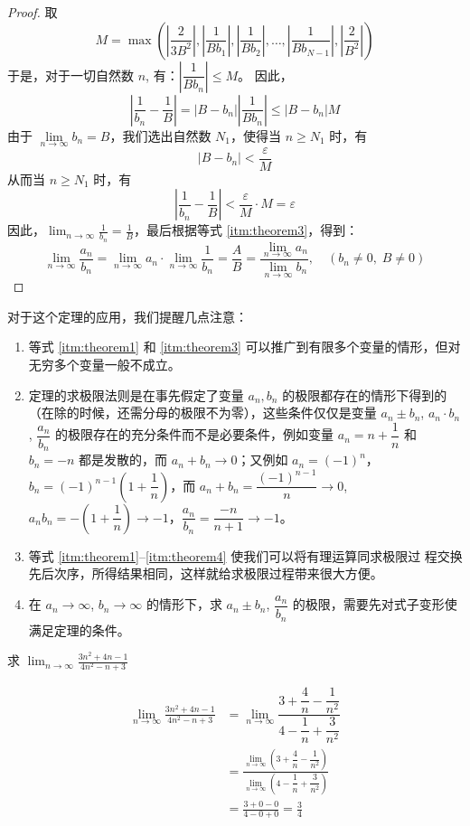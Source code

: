 \begin{proof}
\bigskip 取
\[M=\max\left(\left|\frac{2}{3B^2}\right|, \left|\frac{1}{Bb_1}\right|, \left|\frac{1}{Bb_2}\right|, \ldots, \left|\frac{1}{Bb_{N-1}}\right|,\left|\frac{2}{B^2}\right|\right)\]
于是，对于一切自然数 $n$, 有：$\left|\dfrac{1}{Bb_n}\right|\leqslant M$。
因此，
\[\left|\frac{1}{b_n}-\frac{1}{B}\right|=|B-b_n|\left|\frac{1}{Bb_n}\right|\le |B-b_n|M\]
由于 $\lim\limits_{n\to\infty}b_n=B$，我们选出自然数 $N_1$，使得当 $n\geqslant N_1$ 时，有
\[|B-b_n|<\frac{\varepsilon}{M}\]
从而当 $n\geqslant N_1$ 时，有
\[\left|\frac{1}{b_n}-\frac{1}{B}\right|<\frac{\varepsilon}{M}\cdot M=\varepsilon\]
因此，$\displaystyle \lim_{n\to\infty}\frac{1}{b_n}=\frac{1}{B}$，最后根据等式 \ref{itm:theorem3}，得到：
\[\lim_{n\to\infty}\frac{a_n}{b_n}=\lim_{n\to\infty}a_n\cdot \lim_{n\to\infty}\frac{1}{b_n}=\frac{A}{B}=\frac{\lim\limits_{n\to\infty}a_n}{\lim\limits_{n\to\infty}b_n},\quad (b_n\ne 0,\; B\ne 0)\]
\end{proof}

对于这个定理的应用，我们提醒几点注意：
\begin{enumerate}[itemsep=5pt]
    \item 等式 \ref{itm:theorem1} 和 \ref{itm:theorem3} 可以推广到有限多个变量的情形，但对无穷多个变量一般不成立。
\item {\linespread{1.6}\selectfont 定理的求极限法则是在事先假定了变量 $a_n,b_n$ 的极限都存在的情形下得到的（在除的时候，还需分母的极限不为零），这些条件仅仅是变量 $a_n\pm b_n$, $a_n\cdot b_n$, $\dfrac{a_n}{b_n}$ 的极限存在的充分条件而不是必要条件，例如变量 $a_n=n+\dfrac{1}{n}$ 和 $b_n=-n$ 都是发散的，而 $a_n+b_n\to 0$；又例如 $a_n=(-1)^n$，$b_n=(-1)^{n-1}\left(1+\dfrac{1}{n}\right)$，而 $a_n+b_n=\dfrac{(-1)^{n-1}}{n}\to 0$, $a_nb_n=-\left(1+\dfrac{1}{n}\right)\to -1$，$\dfrac{a_n}{b_n}=\dfrac{-n}{n+1}\to -1$。\par}
\item 等式 \ref{itm:theorem1}--\ref{itm:theorem4} 使我们可以将有理运算同求极限过
程交换先后次序，所得结果相同，这样就给求极限过程带来很大方便。
\item 在 $a_n\to\infty$, $b_n\to\infty$ 的情形下，求 $a_n\pm b_n$, $\dfrac{a_n}{b_n}$ 的极限，需要先对式子变形使满足定理的条件。
\end{enumerate}


\begin{example}
  求 $\displaystyle\lim_{n\to\infty}\frac{3n^2+4n-1}{4n^2-n+3}$
\end{example}

\begin{solution}
\[\begin{split}
    \lim_{n\to\infty}\frac{3n^2+4n-1}{4n^2-n+3}&=\lim_{n\to\infty}\dfrac{3+\dfrac{4}{n}-\dfrac{1}{n^2}}{4-\dfrac{1}{n}+\dfrac{3}{n^2}}\\
    &=\frac{\lim\limits_{n\to\infty}\left(3+\dfrac{4}{n}-\dfrac{1}{n^2}\right)}{\lim\limits_{n\to\infty}\left(4-\dfrac{1}{n}+\dfrac{3}{n^2}\right)}\\
    &=\frac{3+0-0}{4-0+0}=\frac{3}{4}
\end{split}\]    
\end{solution}

